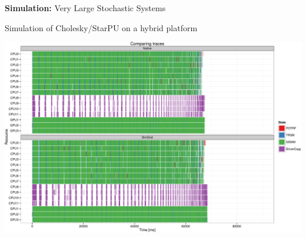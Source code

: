 \documentclass[11pt,xcolor=dvipsnames,presentation]{beamer}
\begin{document}
\begin{frame}[label=sec-10-3]{\textbf{Simulation:} Very Large Stochastic Systems}
{\begin{overlayarea}{\linewidth}{0cm}
\begin{center}
\begin{minipage}{\linewidth}
\begin{exampleblock}{Simulation of Cholesky/StarPU on a hybrid platform}
\begin{center}
          \includegraphics[width=.8\linewidth]{img/comparing_hybrid_mkl-crop.pdf}
        \end{center}
      \end{exampleblock}
    \end{minipage}
  \end{center}
\end{overlayarea}}\medskip
\end{frame}
\end{document}
